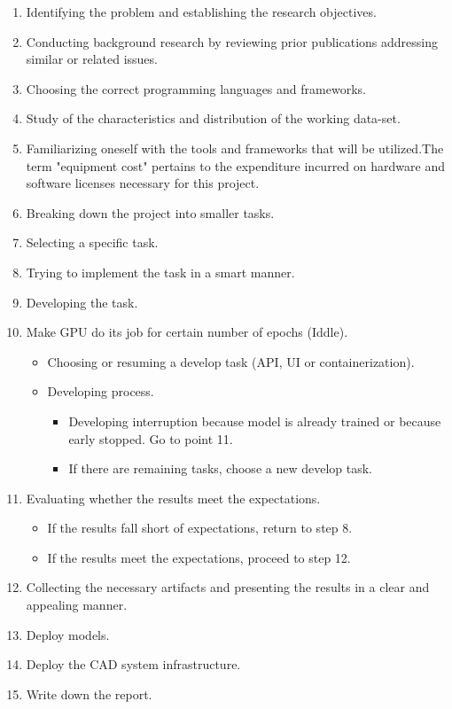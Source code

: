 \begin{enumerate}

  \item Identifying the problem and establishing the research objectives.
  \item Conducting background research by reviewing prior publications addressing similar or related issues.
  \item Choosing the correct programming languages and frameworks.
  \item Study of the characteristics and distribution of the working data-set.
  \item Familiarizing oneself with the tools and frameworks that will be utilized.The term "equipment cost" pertains to the expenditure incurred on hardware and software licenses necessary for this project.
  \item Breaking down the project into smaller tasks.
  \item Selecting a specific task.
  \item Trying to implement the task in a smart manner.
  \item Developing the task.
  \item Make GPU do its job for certain number of epochs (Iddle).

    \begin{itemize}
      \item Choosing or resuming a develop task (API, UI or containerization).
      \item Developing process.
        \begin{itemize}
          \item Developing interruption because model is already trained or because early stopped. Go to point 11.
          \item If there are remaining tasks, choose a new develop task.
        \end{itemize}
    \end{itemize}


  \item Evaluating whether the results meet the expectations.

    \begin{itemize}
      \item If the results fall short of expectations, return to step 8.
      \item If the results meet the expectations, proceed to step 12.
    \end{itemize}

  \item Collecting the necessary artifacts and presenting the results in a clear and appealing manner.

  \item Deploy models.

  \item Deploy the CAD system infrastructure.

  \item Write down the report.

\end{enumerate}

